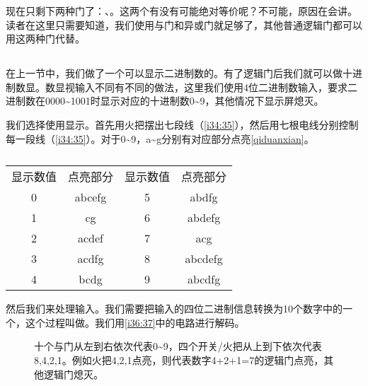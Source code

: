 现在只剩下两种门了：、。这两个有没有可能绝对等价呢？不可能，原因在会讲。读者在这里只需要知道，我们使用与门和异或门就足够了，其他普通逻辑门都可以用这两种门代替。

\subsection{}\label{sec2:2}

在上一节中，我们做了一个可以显示二进制数的。有了逻辑门后我们就可以做十进制数显。数显视输入不同有不同的做法，这里我们使用4位二进制数输入，要求二进制数在0000\~{}1001时显示对应的十进制数0\~{}9，其他情况下显示屏熄灭。

我们选择使用显示。首先用火把摆出七段线（\autoref{i34:35}），然后用七根电线分别控制每一段线（\autoref{i34:35}）。对于0\~{}9，a\~{}g分别有对应部分点亮\autoref{qiduanxian}。

\begin{figure}[!ht]
\centering
{}%
%
\caption{}
\label{i34:35}
\end{figure}

\begin{table}[!ht]
\centering
\begin{tabular}{|cc||cc|}
\hline
显示数值&点亮部分&显示数值&点亮部分\\
0&abcefg&5&abdfg\\
1&cg&6&abdefg\\
2&acdef&7&acg\\
3&acdfg&8&abcdefg\\
4&bcdg&9&abcdfg\\
\hline
\end{tabular}
\caption{}
\label{qiduanxian}
\end{table}

然后我们来处理输入。我们需要把输入的四位二进制信息转换为10个数字中的一个，这个过程叫做。我们用\autoref{i36:37}中的电路进行解码。

\begin{figure}[!ht]
\centering
{}%
%
\caption{十个与门从左到右依次代表0\~{}9，四个开关/火把从上到下依次代表8,4,2,1。例如火把4,2,1点亮，则代表数字4+2+1=7的逻辑门点亮，其他逻辑门熄灭。}
\label{i36:37}
\end{figure}

